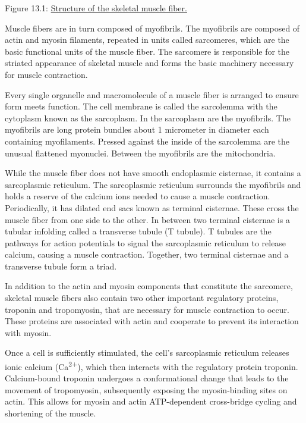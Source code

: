 Figure 13.1:
\href{https://upload.wikimedia.org/wikipedia/commons/9/9c/1022_Muscle_Fibers_\%28small\%29.jpg}{Structure
of the skeletal muscle fiber.}

Muscle fibers are in turn composed of myofibrils. The myofibrils are
composed of actin and myosin filaments, repeated in units called
sarcomeres, which are the basic functional units of the muscle fiber.
The sarcomere is responsible for the striated appearance of skeletal
muscle and forms the basic machinery necessary for muscle contraction.

Every single organelle and macromolecule of a muscle fiber is arranged
to ensure form meets function. The cell membrane is called the
sarcolemma with the cytoplasm known as the sarcoplasm. In the sarcoplasm
are the myofibrils. The myofibrils are long protein bundles about 1
micrometer in diameter each containing myofilaments. Pressed against the
inside of the sarcolemma are the unusual flattened myonuclei. Between
the myofibrils are the mitochondria.

While the muscle fiber does not have smooth endoplasmic cisternae, it
contains a sarcoplasmic reticulum. The sarcoplasmic reticulum surrounds
the myofibrils and holds a reserve of the calcium ions needed to cause a
muscle contraction. Periodically, it has dilated end sacs known as
terminal cisternae. These cross the muscle fiber from one side to the
other. In between two terminal cisternae is a tubular infolding called a
transverse tubule (T tubule). T tubules are the pathways for action
potentials to signal the sarcoplasmic reticulum to release calcium,
causing a muscle contraction. Together, two terminal cisternae and a
transverse tubule form a triad.

In addition to the actin and myosin components that constitute the
sarcomere, skeletal muscle fibers also contain two other important
regulatory proteins, troponin and tropomyosin, that are necessary for
muscle contraction to occur. These proteins are associated with actin
and cooperate to prevent its interaction with myosin.

Once a cell is sufficiently stimulated, the cell's sarcoplasmic
reticulum releases ionic calcium (Ca\textsuperscript{2+}), which then
interacts with the regulatory protein troponin. Calcium-bound troponin
undergoes a conformational change that leads to the movement of
tropomyosin, subsequently exposing the myosin-binding sites on actin.
This allows for myosin and actin ATP-dependent cross-bridge cycling and
shortening of the muscle.

